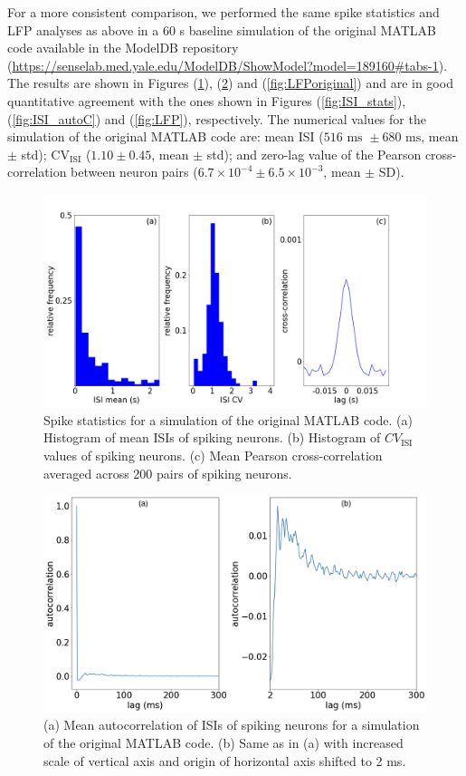 For a more consistent comparison, we performed the same spike statistics and LFP analyses as above in a 60 s baseline simulation of the original MATLAB code available in the ModelDB repository (\url{https://senselab.med.yale.edu/ModelDB/ShowModel?model=189160#tabs-1}). The results are shown in Figures (\ref{fig:ISIoriginal}), (\ref{fig:autoCoriginal}) and (\ref{fig:LFPoriginal}) and are in good quantitative agreement with the ones shown in Figures (\ref{fig:ISI_stats}), (\ref{fig:ISI_autoC}) and (\ref{fig:LFP}), respectively. The numerical values for the simulation of the original MATLAB code are: mean ISI ($516 \text{ ms } \pm 680 \text{ ms}$, mean $\pm$ std); CV$_{\text{ISI}}$ ($1.10 \pm 0.45$, mean $\pm$ std); and zero-lag value of the Pearson cross-correlation between neuron pairs ($6.7 \times 10^{-4} \pm 6.5 \times 10^{-3}$, mean $\pm$ SD). \\

\begin{figure}[H]
    \centering
    \includegraphics[scale=0.30]{ISIoriginal3.png}
    \caption{Spike statistics for a simulation of the original MATLAB code. (a) Histogram of mean ISIs of spiking neurons. (b) Histogram of $CV_{\text{ISI}}$ values of spiking neurons. (c) Mean Pearson cross-correlation averaged across 200 pairs of spiking neurons.}
    \label{fig:ISIoriginal}
\end{figure}

\begin{figure}[H]
    \centering
    \includegraphics[scale=0.30]{autocorroriginal.png}
    \caption{(a) Mean autocorrelation of ISIs of spiking neurons for a simulation of the original MATLAB code. (b) Same as in (a) with increased scale of vertical axis and origin of horizontal axis shifted to 2 ms.}
    \label{fig:autoCoriginal}
\end{figure}

